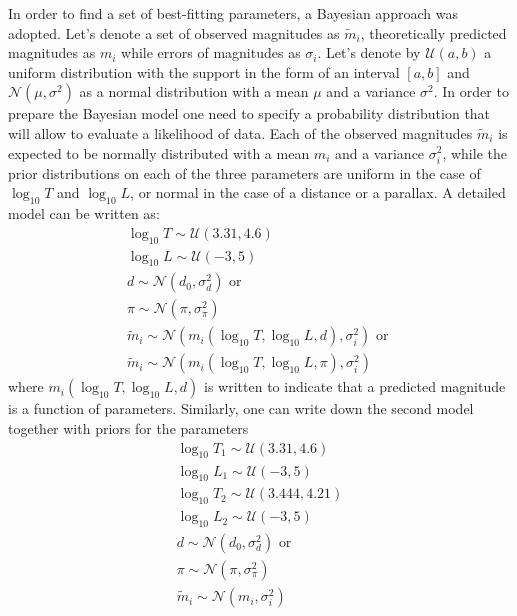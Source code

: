 \documentclass{pracalicmgr}
\begin{document}
In order to find a set of best-fitting parameters, a Bayesian approach was adopted. Let's denote a set of observed magnitudes as $\tilde{m}_i$, theoretically predicted
magnitudes as $m_i$ while errors of magnitudes as $\sigma_i$. Let's denote by $\mathcal{U}(a,b)$ a uniform distribution with the support in the form of an interval $[a,b]$ and $\mathcal{N}(\mu,\sigma^2)$ as a
normal distribution with a mean $\mu$ and a variance $\sigma^2$. In order to prepare the Bayesian model one need to specify a probability distribution that will allow to evaluate a likelihood of
data. Each of the observed magnitudes $\tilde{m}_i$ is expected to be normally distributed with a mean $m_i$ and a variance $\sigma_i^2$, while the prior distributions on each of the three parameters
are uniform in the case of $\log_{10} T$ and $\log_{10} L$, or normal in the case of a distance or a parallax. A detailed model can be written as:
\begin{equation}
    \begin{split}
    \log_{10}{T}\sim \mathcal{U}(3.31,4.6)\\
    \log_{10}{L} \sim \mathcal{U}(-3,5)\\
    d \sim \mathcal{N}(d_0,\sigma_d^2) \textrm{ or } \\
    \pi \sim \mathcal{N} (\pi,\sigma_{\pi}^2)\\
    \tilde{m}_i\sim \mathcal{N}(m_i(\log_{10} T, \log_{10} L, d ),\sigma_i^2) \textrm{ or }\\
    \tilde{m}_i\sim \mathcal{N}(m_i(\log_{10} T, \log_{10} L, \pi ),\sigma_i^2)
    \end{split}
\end{equation}
where $m_i(\log_{10} T, \log_{10} L, d )$ is written to indicate that a predicted magnitude is a function of parameters. 
Similarly, one can write down the second model together with priors for the parameters
\begin{equation}
    \begin{split}
    \log_{10}{T_1}\sim \mathcal{U}(3.31,4.6)\\
    \log_{10}{L_1} \sim \mathcal{U}(-3,5)\\
    \log_{10}{T_2}\sim \mathcal{U}(3.444,4.21)\\
    \log_{10}{L_2} \sim \mathcal{U}(-3,5)\\
    d \sim \mathcal{N}(d_0,\sigma_d^2) \textrm{ or } \\
    \pi \sim \mathcal{N} (\pi,\sigma_{\pi}^2)\\
    \tilde{m}_i\sim \mathcal{N}(m_i,\sigma_i^2)
    \end{split}
\end{equation}
\end{document}
